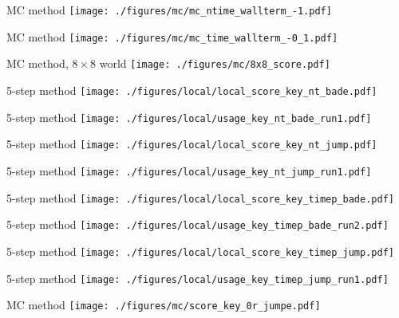 \documentclass[hyperref={pdfpagelabels=false}]{beamer}
\begin{document}
\begin{frame}{MC method}
\texttt{[image: ./figures/mc/mc\_ntime\_wallterm\_-1.pdf]}
\end{frame}

\begin{frame}{MC method}
\texttt{[image: ./figures/mc/mc\_time\_wallterm\_-0\_1.pdf]}
\end{frame}

\begin{frame}{MC method, $8\times8$ world}
\texttt{[image: ./figures/mc/8x8\_score.pdf]}
\end{frame}

\begin{frame}{5-step method}
\texttt{[image: ./figures/local/local\_score\_key\_nt\_bade.pdf]}
\end{frame}

\begin{frame}{5-step method}
\texttt{[image: ./figures/local/usage\_key\_nt\_bade\_run1.pdf]}
\end{frame}

\begin{frame}{5-step method}
\texttt{[image: ./figures/local/local\_score\_key\_nt\_jump.pdf]}
\end{frame}

\begin{frame}{5-step method}
\texttt{[image: ./figures/local/usage\_key\_nt\_jump\_run1.pdf]}
\end{frame}

\begin{frame}{5-step method}
\texttt{[image: ./figures/local/local\_score\_key\_timep\_bade.pdf]}
\end{frame}

\begin{frame}{5-step method}
\texttt{[image: ./figures/local/usage\_key\_timep\_bade\_run2.pdf]}
\end{frame}

\begin{frame}{5-step method}
\texttt{[image: ./figures/local/local\_score\_key\_timep\_jump.pdf]}
\end{frame}

\begin{frame}{5-step method}
\texttt{[image: ./figures/local/usage\_key\_timep\_jump\_run1.pdf]}
\end{frame}

\begin{frame}{MC method}
\texttt{[image: ./figures/mc/score\_key\_0r\_jumpe.pdf]}
\end{frame}
\end{document}
